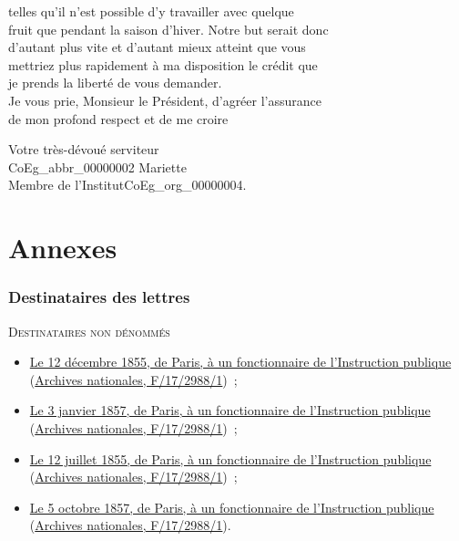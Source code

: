 \documentclass{book}
\begin{document}
{telles qu’il n’est possible d’y travailler avec quelque\\
fruit que pendant la saison d’hiver. Notre but serait donc\\
d’autant plus vite et d’autant mieux atteint que vous\\
mettriez plus rapidement à ma disposition le crédit que\\
je prends la liberté de vous demander.\\
\indent Je vous prie, Monsieur le Président, d’agréer l’assurance\\
de mon profond respect et de me croire
\begin{flushright}\hspace{5cm}Votre très-dévoué serviteur\\
\hspace{5cm}\gls{CoEg_abbr_00000002} Mariette\\
\hspace{5cm}Membre de l’Institut\gls{CoEg_org_00000004}.\end{flushright}

\cleardoublepage
\part*{Annexes}
{}

\cleardoublepage
\section*{Destinataires des lettres}
{}

\begin{center} \textsc{Destinataires non dénommés}\end{center}
\begin{itemize}
\item \hyperlink{CoEg_Mariette_1855-12-12}{Le 12 décembre 1855, de Paris, à un fonctionnaire de l’Instruction publique} (\hyperlink{CoEg_Mariette_ms_002}{Archives nationales, F/17/2988/1})~;
\item \hyperlink{CoEg_Mariette_1857-01-03}{Le 3 janvier 1857, de Paris, à un fonctionnaire de l’Instruction publique} (\hyperlink{CoEg_Mariette_ms_002}{Archives nationales, F/17/2988/1})~;
\item \hyperlink{CoEg_Mariette_1855-07-12}{Le 12 juillet 1855, de Paris, à un fonctionnaire de l’Instruction publique} (\hyperlink{CoEg_Mariette_ms_002}{Archives nationales, F/17/2988/1})~;
\item \hyperlink{CoEg_Mariette_1857-10-05}{Le 5 octobre 1857, de Paris, à un fonctionnaire de l’Instruction publique} (\hyperlink{CoEg_Mariette_ms_002}{Archives nationales, F/17/2988/1}).
\end{itemize}

}
\end{document}
